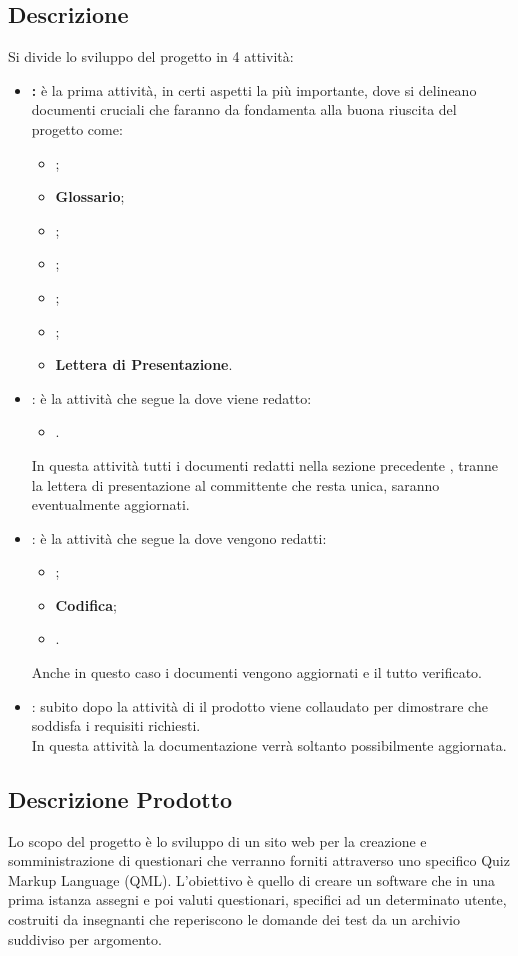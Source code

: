 \documentclass[12pt,a4paper]{article}
\begin{document}
\subsection{Descrizione}

Si divide lo sviluppo del progetto in 4 attività:
\begin{itemize}
	\item \textbf{\FA:} è la prima attività, in certi aspetti la più importante, dove si delineano documenti cruciali che faranno da fondamenta alla buona riuscita del progetto come:
	\begin{itemize}
		\item \textbf{\NdP};
		\item \textbf{Glossario};
		\item \textbf{\SdF};
		\item \textbf{\AdR};
		\item \textbf{\PdP};
		\item \textbf{\PdQ};
		\item \textbf{Lettera di Presentazione}.
	\end{itemize}
	\item \textbf{\FPA}: è la attività che segue la \textbf{\RR} dove viene redatto:
	\begin{itemize}
		\item \textbf{\ST}. 
	\end{itemize} 
	In questa attività tutti i documenti redatti nella sezione precedente , tranne la lettera di presentazione al committente che resta unica, saranno eventualmente aggiornati.
	\item \textbf{\FPDC}: è la attività che segue la \textbf{\RR} dove vengono redatti:
	\begin{itemize}
		\item \textbf{\DP};
		\item \textbf{Codifica};
		\item \textbf{\MU}.
	\end{itemize}
	Anche in questo caso i documenti vengono aggiornati e il tutto verificato.
	\item \textbf{\FVV}: subito dopo la attività di \textbf{\RQ} il prodotto viene collaudato per dimostrare che soddisfa i requisiti richiesti.
	\\In questa attività la documentazione verrà soltanto possibilmente aggiornata.
\end{itemize}

\subsection{Descrizione Prodotto}
Lo scopo del progetto è lo sviluppo di un sito web per la creazione e somministrazione di questionari che verranno forniti attraverso uno specifico Quiz Markup Language (QML). L'obiettivo è quello di creare un software che in una prima istanza assegni e poi valuti questionari, specifici ad un determinato utente, costruiti da insegnanti che reperiscono le domande dei test da un archivio suddiviso per argomento.
\end{document}
